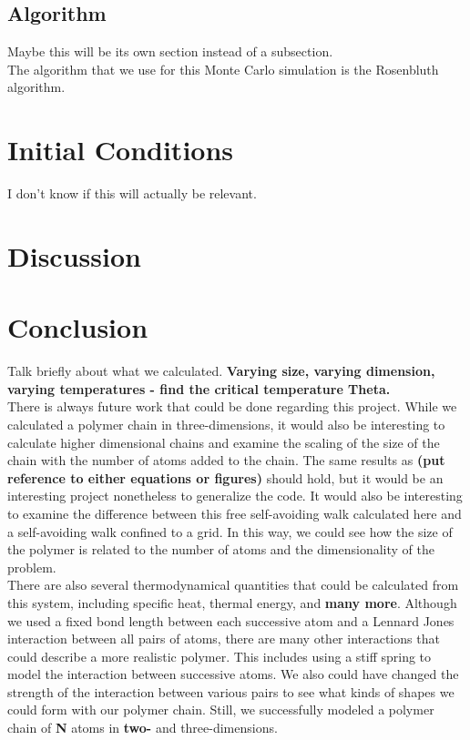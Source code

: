 \documentclass{article}
\begin{document}
\begin{multicols}{2}
\subsection{Algorithm}

Maybe this will be its own section instead of a subsection.\\

The algorithm that we use for this Monte Carlo simulation is the Rosenbluth algorithm.  

\section{Initial Conditions}

I don't know if this will actually be relevant.  

\section{Discussion}

\section{Conclusion}

Talk briefly about what we calculated.  \textbf{Varying size, varying dimension, varying temperatures - find the critical temperature Theta.}\\

There is always future work that could be done regarding this project.  While we calculated a polymer chain in three-dimensions, it would also be interesting to calculate higher dimensional chains and examine the scaling of the size of the chain with the number of atoms added to the chain.  The same results as \textbf{(put reference to either equations or figures)} should hold, but it would be an interesting project nonetheless to generalize the code.  It would also be interesting to examine the difference between this free self-avoiding walk calculated here and a self-avoiding walk confined to a grid.  In this way, we could see how the size of the polymer is related to the number of atoms and the dimensionality of the problem.  \\

There are also several thermodynamical quantities that could be calculated from this system, including specific heat, thermal energy, and \textbf{many more}.  Although we used a fixed bond length between each successive atom and a Lennard Jones interaction between all pairs of atoms, there are many other interactions that could describe a more realistic polymer.  This includes using a stiff spring to model the interaction between successive atoms.  We also could have changed the strength of the interaction between various pairs to see what kinds of shapes we could form with our polymer chain.  Still, we successfully modeled a polymer chain of \textbf{N} atoms in \textbf{two-} and three-dimensions.  

\end{multicols}


\end{document}
